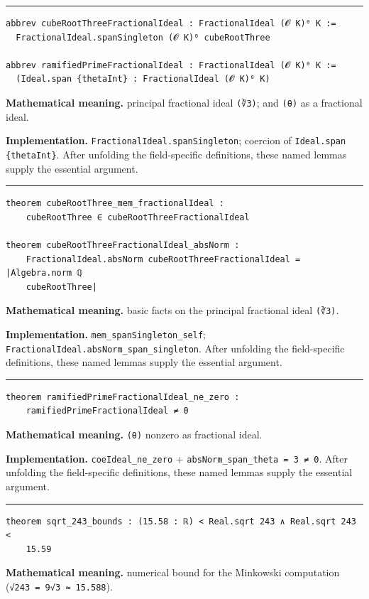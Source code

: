 \documentclass[UTF8,a4paper,11pt,fontset=fandol]{ctexart}
\theoremstyle{definition}
\newcommand{\statementsep}{\par\medskip\hrule\medskip}
\begin{document}
\statementsep
\begin{verbatim}
abbrev cubeRootThreeFractionalIdeal : FractionalIdeal (𝓞 K)⁰ K :=
  FractionalIdeal.spanSingleton (𝓞 K)⁰ cubeRootThree

abbrev ramifiedPrimeFractionalIdeal : FractionalIdeal (𝓞 K)⁰ K :=
  (Ideal.span {thetaInt} : FractionalIdeal (𝓞 K)⁰ K)
\end{verbatim}
\noindent\textbf{Mathematical meaning.} principal fractional ideal \texttt{(∛3)}; and \texttt{(θ)} as a fractional ideal.\par
\noindent\textbf{Implementation.} \texttt{FractionalIdeal.\allowbreak{}spanSingleton}; coercion of \texttt{Ideal.\allowbreak{}span \{thetaInt\}}. After unfolding the field-specific definitions, these named lemmas supply the essential argument.\par
\statementsep
\begin{verbatim}
theorem cubeRootThree_mem_fractionalIdeal :
    cubeRootThree ∈ cubeRootThreeFractionalIdeal

theorem cubeRootThreeFractionalIdeal_absNorm :
    FractionalIdeal.absNorm cubeRootThreeFractionalIdeal = |Algebra.norm ℚ
    cubeRootThree|
\end{verbatim}
\noindent\textbf{Mathematical meaning.} basic facts on the principal fractional ideal \texttt{(∛3)}.\par
\noindent\textbf{Implementation.} \texttt{mem\_\allowbreak{}spanSingleton\_\allowbreak{}self}; \texttt{FractionalIdeal.\allowbreak{}absNorm\_\allowbreak{}span\_\allowbreak{}singleton}. After unfolding the field-specific definitions, these named lemmas supply the essential argument.\par
\statementsep
\begin{verbatim}
theorem ramifiedPrimeFractionalIdeal_ne_zero :
    ramifiedPrimeFractionalIdeal ≠ 0
\end{verbatim}
\noindent\textbf{Mathematical meaning.} \texttt{(θ)} nonzero as fractional ideal.\par
\noindent\textbf{Implementation.} \texttt{coeIdeal\_\allowbreak{}ne\_\allowbreak{}zero} + \texttt{absNorm\_\allowbreak{}span\_\allowbreak{}theta = 3 ≠ 0}. After unfolding the field-specific definitions, these named lemmas supply the essential argument.\par
\statementsep
\begin{verbatim}
theorem sqrt_243_bounds : (15.58 : ℝ) < Real.sqrt 243 ∧ Real.sqrt 243 <
    15.59
\end{verbatim}
\noindent\textbf{Mathematical meaning.} numerical bound for the Minkowski computation (\texttt{√243 = 9√3 ≈ 15.\allowbreak{}588}).\par
\end{document}
